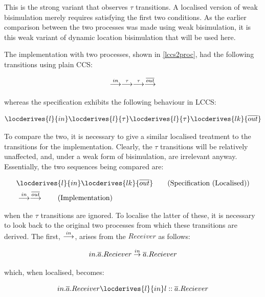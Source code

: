 \noindent This is the strong variant that observes $\tau$ transitions.
A localised version of weak bisimulation merely requires satisfying the
first two conditions.  As the earlier comparison between the two
processes was made using weak bisimulation, it is this weak variant of
dynamic location bisimulation that will be used here.

The implementation with two processes, shown in \ref{lccs2proc}, had the
following transitions using plain CCS:

\begin{equation}
  \stackrel{in}{\longrightarrow} \stackrel{\tau}{\longrightarrow} \stackrel{\tau}{\longrightarrow} \stackrel{\overline{out}}{\longrightarrow}
\end{equation}

\noindent whereas the specification exhibits the following behaviour in
LCCS:

\begin{equation}
  \locderives{l}{in} \locderives{l}{\tau} \locderives{l}{\tau} \locderives{lk}{\overline{out}}
\end{equation}

\noindent To compare the two, it is necessary to give a similar
localised treatment to the transitions for the implementation.  Clearly,
the $\tau$ transitions will be relatively unaffected, and, under a weak
form of bisimulation, are irrelevant anyway.  Essentially, the two
sequences being compared are:

\begin{align}
& \locderives{l}{in} \locderives{lk}{\overline{out}} \tag{Specification
(Localised)} \\
& \lderives{in} \lderives{\overline{out}} \tag{Implementation}
\end{align}

\noindent when the $\tau$ transitions are ignored.  To localise the
latter of these, it is necessary to look back to the original two
processes from which these transitions are derived.  The first,
$\stackrel{in}{\longrightarrow}$, arises from the $Receiver$ as follows:

\begin{equation}
in.\overline{a}.Reciever \stackrel{in}{\rightarrow} \overline{a}.Reciever
\end{equation}

\noindent which, when localised, becomes:

\begin{equation}
in.\overline{a}.Receiver \locderives{l}{in} l::\overline{a}.Reciever
\end{equation}

